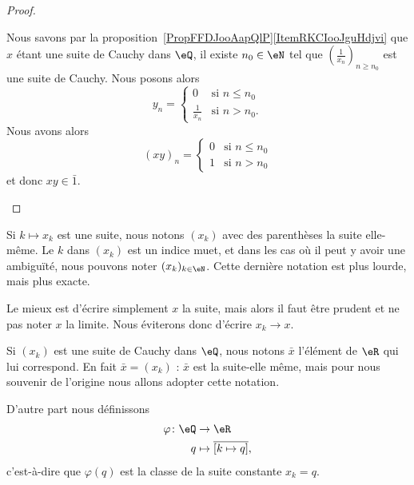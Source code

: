 \begin{proof}
\begin{subproof}
		Nous savons par la proposition~\ref{PropFFDJooAapQlP}\ref{ItemRKCIooJguHdjvi} que \( x\) étant une suite de Cauchy dans \( \eQ\), il existe \( n_0\in \eN\) tel que \( \left( \frac{1}{ x_n } \right)_{n\geq n_0}\) est une suite de Cauchy. Nous posons alors
		\begin{equation}
			y_n=\begin{cases}
				0               & \text{si } n\leq n_0 \\
				\frac{1}{ x_n } & \text{si } n>n_0.
			\end{cases}
		\end{equation}
		Nous avons alors
		\begin{equation}
			(xy)_n=\begin{cases}
				0 & \text{si } n\leq n_0 \\
				1 & \text{si } n>n_0
			\end{cases}
		\end{equation}
		et donc \( xy\in\bar 1\).
	\end{subproof}
\end{proof}

\begin{normaltext}      \label{NORMooWBYNooBQaPPk}
	Si \( k\mapsto x_k\) est une suite, nous notons \( (x_k)\) avec des parenthèses la suite elle-même. Le \( k\) dans \( (x_k)\) est un indice muet, et dans les cas où il peut y avoir une ambiguïté, nous pouvons noter \( (x_k)_{k\in \eN}\). Cette dernière notation est plus lourde, mais plus exacte.

	Le mieux est d'écrire simplement \( x\) la suite, mais alors il faut être prudent et ne pas noter \( x\) la limite. Nous éviterons donc d'écrire \( x_k\to x\).

	Si \( (x_k)\) est une suite de Cauchy dans \( \eQ\), nous notons \( \bar x\) l'élément de \( \eR\) qui lui correspond. En fait \( \bar x=(x_k)\) : \( \bar x\) est la suite-elle même, mais pour nous souvenir de l'origine nous allons adopter cette notation.

	D'autre part nous définissons
	\begin{equation}
		\begin{aligned}
			\varphi\colon \eQ & \to \eR                           \\
			q                 & \mapsto \overline{ [k\mapsto q]},
		\end{aligned}
	\end{equation}
	c'est-à-dire que \( \varphi(q)\) est la classe de la suite constante \( x_k=q\).
\end{normaltext}

